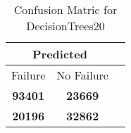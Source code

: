 \begin{table}[] 
\caption{Confusion Matric for DecisionTrees20} 
\label{Table: Prediction Accuracy-DMDDecisionTrees20OnlySunEKF-combinationReflection-Reflection} 
\centering 
\begin{tabular} 
 {@{}ccc@{}} 
\toprule 
\multicolumn{2}{c}{\textbf{Predicted}}
 \\ \midrule 
\multicolumn{1}{|c|}{Failure} & 
\multicolumn{1}{c|}{No Failure}
 \\ \midrule 
\multicolumn{1}{|c|}{\color{green}\textbf{93401}} & 
\multicolumn{1}{c|}{\color{red}\textbf{23669}}
 \\ \midrule 
\multicolumn{1}{|c|}{\color{red}\textbf{20196}} & 
\multicolumn{1}{c|}{\color{green}\textbf{32862}}
 \\ \bottomrule 
\end{tabular} 
\end{table} 
